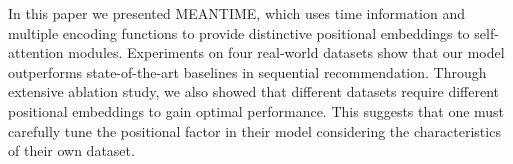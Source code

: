 In this paper we presented MEANTIME, which uses time information and multiple encoding functions to provide distinctive positional embeddings to self-attention modules.  Experiments on four real-world datasets show that our model outperforms state-of-the-art baselines in sequential recommendation. Through extensive ablation study, we also showed that different datasets require different positional embeddings to gain optimal performance. This suggests that one must carefully tune the positional factor in their model considering the characteristics of their own dataset.
